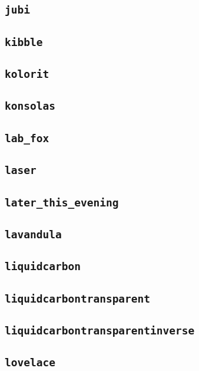 \subsection{\texttt{jubi}}
\newpage
\subsection{\texttt{kibble}}
\newpage
\subsection{\texttt{kolorit}}
\newpage
\subsection{\texttt{konsolas}}
\newpage
\subsection{\texttt{lab\_fox}}
\newpage
\subsection{\texttt{laser}}
\newpage
\subsection{\texttt{later\_this\_evening}}
\newpage
\subsection{\texttt{lavandula}}
\newpage
\subsection{\texttt{liquidcarbon}}
\newpage
\subsection{\texttt{liquidcarbontransparent}}
\newpage
\subsection{\texttt{liquidcarbontransparentinverse}}
\newpage
\subsection{\texttt{lovelace}}
\newpage
